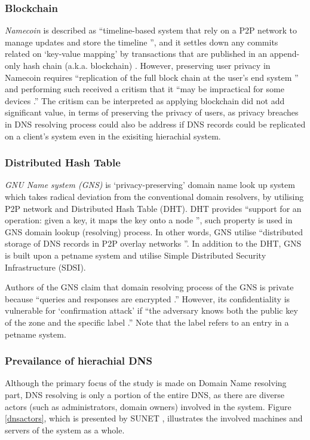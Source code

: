 \subsubsection{Blockchain}
\textit{Namecoin} \cite{loibl2014namecoin} is described as ``timeline-based system that rely on a P2P network to manage updates and store the timeline \cite{grothoff2017nsa}'', and it settles down any commits related on `key-value mapping' by transactions that are published in an append-only hash chain (a.k.a. blockchain) \cite{kalodner2015empirical}.
However, preserving user privacy in Namecoin requires ``replication of the full block chain at the user's end system \cite{grothoff2017nsa}'' and performing such received a critism that it ``may be impractical for some devices \cite{grothoff2017nsa}.''
The critism can be interpreted as applying blockchain did not add significant value, in terms of preserving the privacy of users, as privacy breaches in DNS resolving process could also be address if DNS records could be replicated on a client's system even in the exisiting hierachial system. 

\subsubsection{Distributed Hash Table}
\textit{GNU Name system (GNS)} is `privacy-preserving' domain name look up system which takes radical deviation from the conventional domain resolvers, by utilising P2P network and Distributed Hash Table (DHT).
DHT provides ``support for an operation: given a key, it maps the key onto a node \cite{stoica2001chord}'', such property is used in GNS domain lookup (resolving) process. 
In other words, GNS utilise ``distributed storage of DNS records in P2P overlay networks \cite{wachs2014censorship}''. In addition to the DHT, GNS is built upon a petname system \cite{stiegler2005introduction} and utilise Simple Distributed Security Infrastructure (SDSI).

Authors of the GNS claim that domain resolving process of the GNS is private because ``queries and responses are encrypted \cite{grothoff2017nsa, wachs2014censorship}.''
However, its confidentiality is vulnerable for `confirmation attack' if ``the adversary knows both the public key of the zone and the specific label \cite{wachs2014censorship}.'' Note that the label refers to an entry in a petname system. 

\subsubsection{Prevailance of hierachial DNS}
Although the primary focus of the study is made on Domain Name resolving part, DNS resolving is only a portion of the entire DNS, as there are diverse actors (such as administrators, domain owners) involved in the system.
Figure \ref{dnsactors}, which is presented by SUNET \cite{SUNET-DNS}, illustrates the involved machines and servers of the system as a whole.

